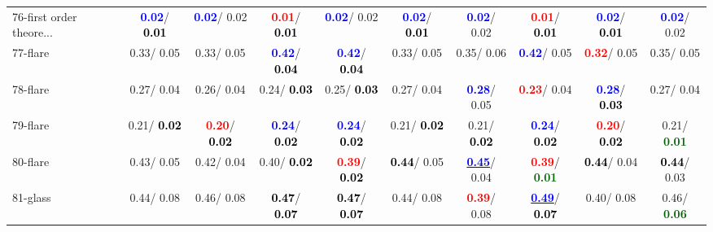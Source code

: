 \begin{table}[h]
\begin{center}
{\begin{tabular}{lc|c|c|c|c|c|c|c|c}
76-first order theore... & \textcolor{blue}{\textbf{  0.02}}/\textcolor{black}{\textbf{  0.01}} & \textcolor{blue}{\textbf{  0.02}}/  0.02 & \textcolor{red}{\textbf{  0.01}}/\textcolor{black}{\textbf{  0.01}} & \textcolor{blue}{\textbf{  0.02}}/  0.02 & \textcolor{blue}{\textbf{  0.02}}/\textcolor{black}{\textbf{  0.01}} & \textcolor{blue}{\textbf{  0.02}}/  0.02 & \textcolor{red}{\textbf{  0.01}}/\textcolor{black}{\textbf{  0.01}} & \textcolor{blue}{\textbf{  0.02}}/\textcolor{black}{\textbf{  0.01}} & \textcolor{blue}{\textbf{  0.02}}/  0.02 \\
77-flare &   0.33/  0.05 &   0.33/  0.05 & \textcolor{blue}{\textbf{  0.42}}/\textcolor{black}{\textbf{  0.04}} & \textcolor{blue}{\textbf{  0.42}}/\textcolor{black}{\textbf{  0.04}} &   0.33/  0.05 &   0.35/  0.06 & \textcolor{blue}{\textbf{  0.42}}/  0.05 & \textcolor{red}{\textbf{  0.32}}/  0.05 &   0.35/  0.05 \\
78-flare &   0.27/  0.04 &   0.26/  0.04 &   0.24/\textcolor{black}{\textbf{  0.03}} &   0.25/\textcolor{black}{\textbf{  0.03}} &   0.27/  0.04 & \textcolor{blue}{\textbf{  0.28}}/  0.05 & \textcolor{red}{\textbf{  0.23}}/  0.04 & \textcolor{blue}{\textbf{  0.28}}/\textcolor{black}{\textbf{  0.03}} &   0.27/  0.04 \\ \hline
79-flare &   0.21/\textcolor{black}{\textbf{  0.02}} & \textcolor{red}{\textbf{  0.20}}/\textcolor{black}{\textbf{  0.02}} & \textcolor{blue}{\textbf{  0.24}}/\textcolor{black}{\textbf{  0.02}} & \textcolor{blue}{\textbf{  0.24}}/\textcolor{black}{\textbf{  0.02}} &   0.21/\textcolor{black}{\textbf{  0.02}} &   0.21/\textcolor{black}{\textbf{  0.02}} & \textcolor{blue}{\textbf{  0.24}}/\textcolor{black}{\textbf{  0.02}} & \textcolor{red}{\textbf{  0.20}}/\textcolor{black}{\textbf{  0.02}} &   0.21/\textcolor{darkgreen}{\textbf{  0.01}} \\
80-flare &   0.43/  0.05 &   0.42/  0.04 &   0.40/\textcolor{black}{\textbf{  0.02}} & \textcolor{red}{\textbf{  0.39}}/\textcolor{black}{\textbf{  0.02}} & \textcolor{black}{\textbf{  0.44}}/  0.05 & \underline{\textcolor{blue}{\textbf{  0.45}}}/  0.04 & \textcolor{red}{\textbf{  0.39}}/\textcolor{darkgreen}{\textbf{  0.01}} & \textcolor{black}{\textbf{  0.44}}/  0.04 & \textcolor{black}{\textbf{  0.44}}/  0.03 \\
81-glass &   0.44/  0.08 &   0.46/  0.08 & \textcolor{black}{\textbf{  0.47}}/\textcolor{black}{\textbf{  0.07}} & \textcolor{black}{\textbf{  0.47}}/\textcolor{black}{\textbf{  0.07}} &   0.44/  0.08 & \textcolor{red}{\textbf{  0.39}}/  0.08 & \underline{\textcolor{blue}{\textbf{  0.49}}}/\textcolor{black}{\textbf{  0.07}} &   0.40/  0.08 &   0.46/\textcolor{darkgreen}{\textbf{  0.06}} \\

\end{tabular}}
\end{center}
\end{table}
